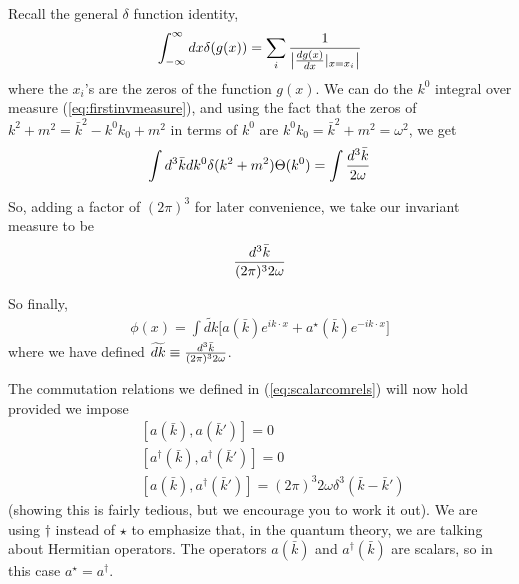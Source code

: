 \documentclass[12pt,epsf]{article}
\def\nolabel{\nonumber }
\def\nolabel{\nonumber }
\begin{document}
Recall the general $\delta$ function identity,
\begin{eqnarray}
\int_{-\infty}^{\infty} dx \delta(g(x)) = \sum_i {1 \over \big|{dg(x)
\over dx}|_{x=x_i}\big|}\nolabel
\end{eqnarray}
where the $x_i$'s  are the zeros of the function $g(x)$.  We can do the
$k^0$ integral over measure (\ref{eq:firstinvmeasure}), and using the
fact that the zeros of $k^2+m^2 = \bar k^2 -  k^0k_0+m^2$ in terms of
$k^0$ are $k^0k_0 = \bar k^2+m^2 = \omega^2$, we get 
\begin{eqnarray}
\int d^3 \bar k dk^0\delta(k^2+m^2)\Theta(k^0) = \int {d^3\bar k \over
2\omega}\nolabel
\end{eqnarray}

So, adding a factor of $(2\pi)^3$ for later convenience, we take our
invariant measure to be 
\begin{eqnarray}
{d^3\bar k \over (2\pi)^3 2\omega}\nolabel
\end{eqnarray}

So finally, 
\begin{eqnarray}
\phi(x) = \int \widetilde{dk}\big[a(\bar k)e^{ik\cdot x} +
a^{\star}(\bar k)e^{-ik\cdot x}\big] \label{eq:scalarfield}
\end{eqnarray}
where we have defined $\widetilde{dk} \equiv {d^3\bar k \over (2\pi)^3
2\omega}$.  

The commutation relations we defined in (\ref{eq:scalarcomrels}) will
now hold provided we impose
\begin{eqnarray}
& &\;[a(\bar k),a(\bar k')] = 0 \nolabel  \\
& &\;[a^{\dagger}(\bar k),a^{\dagger} (\bar k') ] = 0 \nolabel \\
& &\;[a(\bar k),a^{\dagger}(\bar k')] = (2\pi)^3 2\omega \delta^3(\bar
k - \bar k') \label{eq:acoms}
\end{eqnarray}
(showing this is fairly tedious, but we encourage you to work it out). 
We are using $\dagger$ instead of $\star$ to emphasize that, in the
quantum theory, we are talking about Hermitian operators.  The
operators $a(\bar k)$ and $a^{\dagger}(\bar k)$ are scalars, so in this
case $a^{\star} = a^{\dagger}$.  
\end{document}
